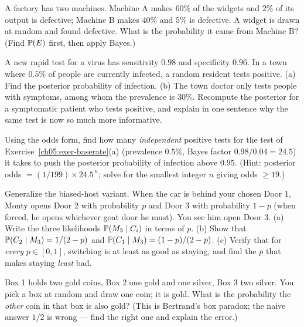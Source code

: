 \begin{exercise}
\label{ch05:exer-factory}
A factory has two machines. Machine A makes $60\%$ of the widgets and $2\%$ of its output
is defective; Machine B makes $40\%$ and $5\%$ is defective. A widget is drawn at random
and found defective. What is the probability it came from Machine B? (Find $\P(E)$ first,
then apply Bayes.)
\end{exercise}

\begin{exercise}
\label{ch05:exer-baserate}
A new rapid test for a virus has sensitivity $0.98$ and specificity $0.96$. In a town
where $0.5\%$ of people are currently infected, a random resident tests positive. (a) Find
the posterior probability of infection. (b) The town doctor only tests people with
symptoms, among whom the prevalence is $30\%$. Recompute the posterior for a symptomatic
patient who tests positive, and explain in one sentence why the same test is now so much
more informative.
\end{exercise}

\begin{exercise}
\label{ch05:exer-compounding}
Using the odds form, find how many \emph{independent} positive tests for the test of
Exercise~\ref{ch05:exer-baserate}(a) (prevalence $0.5\%$, Bayes factor $0.98/0.04 = 24.5$)
it takes to push the posterior probability of infection above $0.95$. (Hint: posterior odds
$= (1/199)\times 24.5^{\,n}$; solve for the smallest integer $n$ giving odds $\ge 19$.)
\end{exercise}

\begin{exercise}
\label{ch05:exer-monty-bias}
Generalize the biased-host variant. When the car is behind your chosen Door $1$, Monty
opens Door $2$ with probability $p$ and Door $3$ with probability $1-p$ (when forced, he
opens whichever goat door he must). You see him open Door $3$. (a) Write the three
likelihoods $\P(M_3\given C_i)$ in terms of $p$. (b) Show that
$\P(C_2\given M_3) = 1/(2-p)$ and $\P(C_1\given M_3) = (1-p)/(2-p)$. (c) Verify that for
\emph{every} $p\in[0,1]$, switching is at least as good as staying, and find the $p$ that
makes staying \emph{least} bad.
\end{exercise}

\begin{exercise}
\label{ch05:exer-bertrand}
Box 1 holds two gold coins, Box 2 one gold and one silver, Box 3 two silver. You pick a
box at random and draw one coin; it is gold. What is the probability the \emph{other}
coin in that box is also gold? (This is Bertrand's box paradox; the naive answer $1/2$ is
wrong --- find the right one and explain the error.)
\end{exercise}

